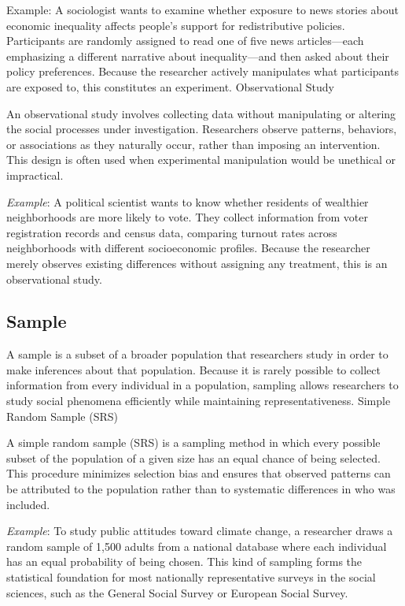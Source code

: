 \documentclass[
  letterpaper,
  DIV=11,
  numbers=noendperiod]{scrreprt}
\begin{document}
Example: A sociologist wants to examine whether exposure to news stories
about economic inequality affects people's support for redistributive
policies. Participants are randomly assigned to read one of five news
articles---each emphasizing a different narrative about inequality---and
then asked about their policy preferences. Because the researcher
actively manipulates what participants are exposed to, this constitutes
an experiment. Observational Study

An observational study involves collecting data without manipulating or
altering the social processes under investigation. Researchers observe
patterns, behaviors, or associations as they naturally occur, rather
than imposing an intervention. This design is often used when
experimental manipulation would be unethical or impractical.

\emph{Example}: A political scientist wants to know whether residents of
wealthier neighborhoods are more likely to vote. They collect
information from voter registration records and census data, comparing
turnout rates across neighborhoods with different socioeconomic
profiles. Because the researcher merely observes existing differences
without assigning any treatment, this is an observational study.

\subsection{Sample}\label{sample-1}

A sample is a subset of a broader population that researchers study in
order to make inferences about that population. Because it is rarely
possible to collect information from every individual in a population,
sampling allows researchers to study social phenomena efficiently while
maintaining representativeness. Simple Random Sample (SRS)

A simple random sample (SRS) is a sampling method in which every
possible subset of the population of a given size has an equal chance of
being selected. This procedure minimizes selection bias and ensures that
observed patterns can be attributed to the population rather than to
systematic differences in who was included.

\emph{Example}: To study public attitudes toward climate change, a
researcher draws a random sample of 1,500 adults from a national
database where each individual has an equal probability of being chosen.
This kind of sampling forms the statistical foundation for most
nationally representative surveys in the social sciences, such as the
General Social Survey or European Social Survey.
\end{document}
